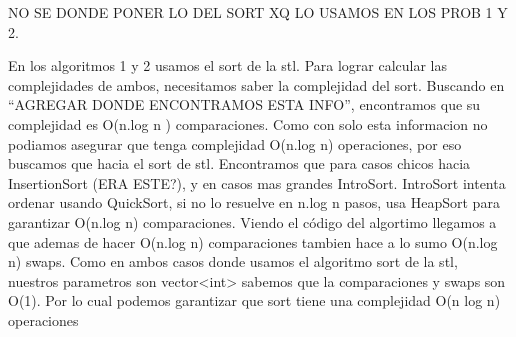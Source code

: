 NO SE DONDE PONER LO DEL SORT XQ LO USAMOS EN LOS PROB 1 Y 2.

En los algoritmos 1 y 2 usamos el sort de la stl. Para lograr calcular las complejidades de ambos, necesitamos saber la complejidad del sort. Buscando en ``AGREGAR DONDE ENCONTRAMOS ESTA INFO'', encontramos que su complejidad es O(n.log n ) comparaciones. Como con solo esta informacion no podiamos asegurar que tenga complejidad O(n.log n) operaciones, por eso buscamos que hacia el sort de stl. Encontramos que para casos chicos hacia InsertionSort (ERA ESTE?), y en casos mas grandes IntroSort. IntroSort intenta ordenar usando QuickSort, si no lo resuelve en n.log n pasos, usa HeapSort para garantizar O(n.log n) comparaciones. Viendo el código del algortimo llegamos a que ademas de hacer O(n.log n) comparaciones tambien hace a lo sumo O(n.log n) swaps.
Como en ambos casos donde usamos el algoritmo sort de la stl, nuestros parametros son vector<int> sabemos que la comparaciones y swaps son O(1). Por lo cual podemos garantizar que sort tiene una complejidad O(n log n) operaciones